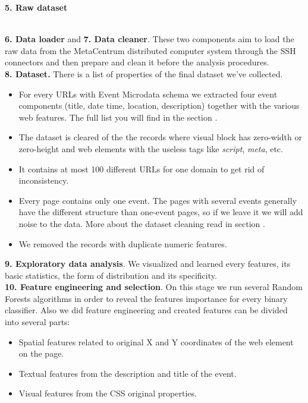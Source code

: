 \textbf{5. Raw dataset}\\\

\textbf{6. Data loader} and \textbf{7. Data cleaner}. These two components aim to load the raw data from the MetaCentrum distributed computer system through the SSH connectors and then prepare and clean it before the analysis procedures.\\

\textbf{8. Dataset.} There is a list of properties of the final dataset we've collected.

\begin{itemize}
    \item For every URLs with Event Microdata schema we extracted four event components (title, date time, location, description) together with the various web features. The full list you will find in the section . 
    \item The dataset is cleared of the the records where visual block has zero-width or zero-height and web elements with the useless tags like \textit{script}, \textit{meta}, etc.
    \item It contains at most 100 different URLs for one domain to get rid of inconsistency. 
    \item Every page contains only one event. The pages with several events generally have the different structure than one-event pages, so if we leave it we will add noise to the data. More about the dataset cleaning read in section .  
    \item We removed the records with duplicate numeric features.
\end{itemize}

\textbf{9. Exploratory data analysis}. We visualized and learned every features, its basic statistics, the form of distribution and its specificity.\\

\textbf{10. Feature engineering and selection}. On this stage we run several Random Forests algorithms in order to reveal the features importance for every binary classifier. Also we did feature engineering and created features can be divided into several parts:
\begin{itemize}
\item Spatial features related to original X and Y coordinates of the web element on the page.
\item Textual features from the description and title of the event. 
\item Visual features from the CSS original properties.  
\end{itemize}

